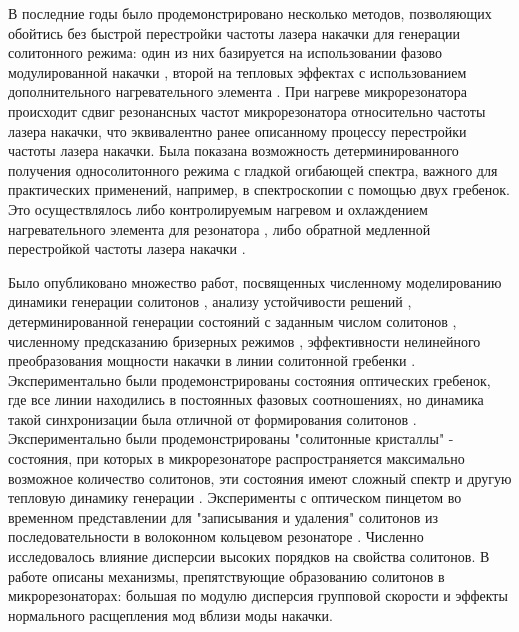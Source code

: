 В последние годы было продемонстрировано несколько методов, позволяющих обойтись без быстрой перестройки частоты лазера накачки для генерации солитонного режима: один из них базируется на использовании фазово модулированной накачки \cite{Jang2015ol}, второй на тепловых эффектах с использованием дополнительного нагревательного элемента \cite{Joshi2016}. При нагреве микрорезонатора происходит сдвиг резонансных частот микрорезонатора относительно частоты лазера накачки, что эквивалентно ранее описанному процессу перестройки частоты лазера накачки. Была показана возможность детерминированного получения односолитонного режима с гладкой огибающей спектра, важного для практических применений, например, в спектроскопии с помощью двух гребенок. Это осуществлялось либо контролируемым нагревом и охлаждением нагревательного элемента для резонатора \cite{Joshi2016}, либо обратной медленной перестройкой частоты лазера накачки \cite{Karpov2017}.

Было опубликовано множество работ, посвященных численному моделированию динамики генерации солитонов \cite{Lamont2013,Hansson2016}, анализу устойчивости решений \cite{Godey2014}, детерминированной генерации состояний с заданным числом солитонов \cite{Jaramillo2015}, численному предсказанию бризерных режимов \cite{Matsko2012}, эффективности нелинейного преобразования мощности накачки в линии солитонной гребенки \cite{Bao2014}. Экспериментально были продемонстрированы состояния оптических гребенок, где все линии находились в постоянных фазовых соотношениях, но динамика такой синхронизации была отличной от формирования солитонов \cite{Saha2013,DelHaye2014}. Экспериментально были продемонстрированы "солитонные кристаллы" - состояния, при которых в микрорезонаторе распространяется максимально возможное количество солитонов, эти состояния имеют сложный спектр и другую тепловую динамику генерации \cite{Cole2017crystals}. Эксперименты с оптическом пинцетом во временном представлении для "записывания и удаления" солитонов из последовательности в волоконном кольцевом резонаторе \cite{Jang2015}. Численно исследовалось влияние дисперсии высоких порядков \cite{Wang2014} на свойства солитонов. В работе \cite{HerrPRL2014} описаны механизмы, препятствующие образованию солитонов в микрорезонаторах: большая по модулю дисперсия групповой скорости и эффекты нормального расщепления мод вблизи моды накачки.

